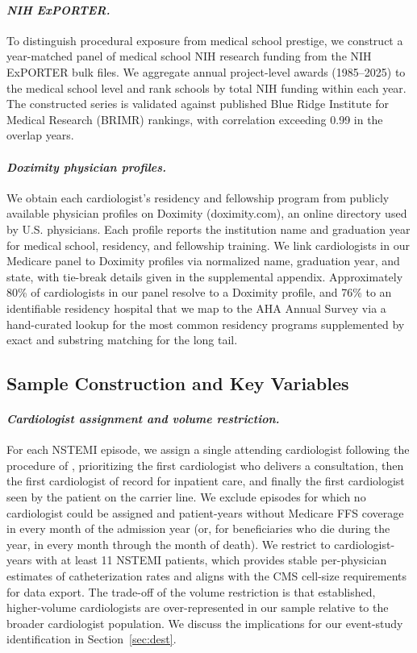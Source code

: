 \documentclass[12pt]{article}
\let\textcite\citet
\begin{document}
\paragraph{\textit{NIH ExPORTER.}}
To distinguish procedural exposure from medical school prestige, we construct a year-matched panel of medical school NIH research funding from the NIH ExPORTER bulk files. We aggregate annual project-level awards (1985--2025) to the medical school level and rank schools by total NIH funding within each year. The constructed series is validated against published Blue Ridge Institute for Medical Research (BRIMR) rankings, with correlation exceeding 0.99 in the overlap years.

\paragraph{\textit{Doximity physician profiles.}}
We obtain each cardiologist's residency and fellowship program from publicly available physician profiles on Doximity (doximity.com), an online directory used by U.S. physicians. Each profile reports the institution name and graduation year for medical school, residency, and fellowship training. We link cardiologists in our Medicare panel to Doximity profiles via normalized name, graduation year, and state, with tie-break details given in the supplemental appendix. Approximately 80\% of cardiologists in our panel resolve to a Doximity profile, and 76\% to an identifiable residency hospital that we map to the AHA Annual Survey via a hand-curated lookup for the most common residency programs supplemented by exact and substring matching for the long tail.

\subsection{Sample Construction and Key Variables}
\label{sec:sample}

\paragraph{\textit{Cardiologist assignment and volume restriction.}}
For each NSTEMI episode, we assign a single attending cardiologist following the procedure of \textcite{molitor2018}, prioritizing the first cardiologist who delivers a consultation, then the first cardiologist of record for inpatient care, and finally the first cardiologist seen by the patient on the carrier line. We exclude episodes for which no cardiologist could be assigned and patient-years without Medicare FFS coverage in every month of the admission year (or, for beneficiaries who die during the year, in every month through the month of death). We restrict to cardiologist-years with at least 11 NSTEMI patients, which provides stable per-physician estimates of catheterization rates and aligns with the CMS cell-size requirements for data export. The trade-off of the volume restriction is that established, higher-volume cardiologists are over-represented in our sample relative to the broader cardiologist population. We discuss the implications for our event-study identification in Section~\ref{sec:dest}.
\end{document}
